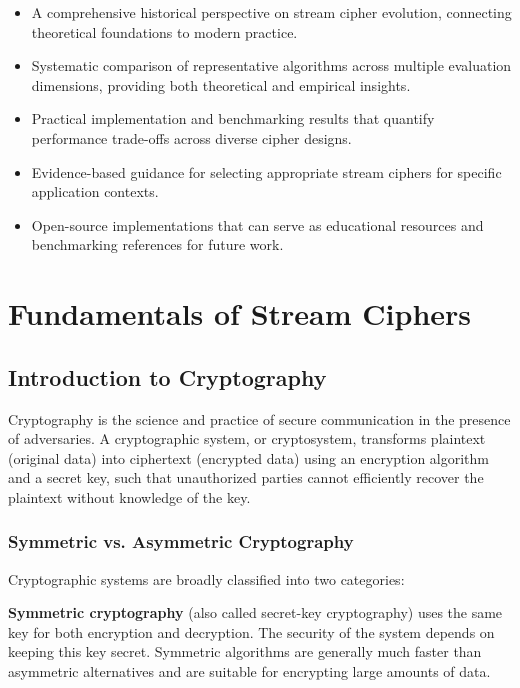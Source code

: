 \documentclass[12pt,a4paper,oneside]{report}
\begin{document}
\begin{itemize}
    \item A comprehensive historical perspective on stream cipher evolution, connecting theoretical foundations to modern practice.
    
    \item Systematic comparison of representative algorithms across multiple evaluation dimensions, providing both theoretical and empirical insights.
    
    \item Practical implementation and benchmarking results that quantify performance trade-offs across diverse cipher designs.
    
    \item Evidence-based guidance for selecting appropriate stream ciphers for specific application contexts.
    
    \item Open-source implementations that can serve as educational resources and benchmarking references for future work.
\end{itemize}

\chapter{Fundamentals of Stream Ciphers}
\label{ch:fundamentals}

\section{Introduction to Cryptography}
\label{sec:crypto-intro}

Cryptography is the science and practice of secure communication in the presence of adversaries. A cryptographic system, or cryptosystem, transforms plaintext (original data) into ciphertext (encrypted data) using an encryption algorithm and a secret key, such that unauthorized parties cannot efficiently recover the plaintext without knowledge of the key.

\subsection{Symmetric vs. Asymmetric Cryptography}

Cryptographic systems are broadly classified into two categories:

\textbf{Symmetric cryptography} (also called secret-key cryptography) uses the same key for both encryption and decryption. The security of the system depends on keeping this key secret. Symmetric algorithms are generally much faster than asymmetric alternatives and are suitable for encrypting large amounts of data.
\end{document}
